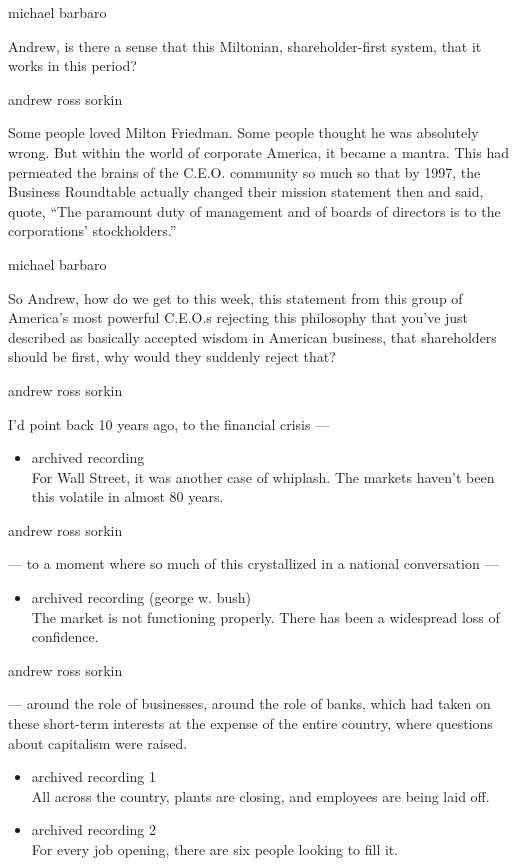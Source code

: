 michael barbaro

Andrew, is there a sense that this Miltonian, shareholder-first system,
that it works in this period?

andrew ross sorkin

Some people loved Milton Friedman. Some people thought he was absolutely
wrong. But within the world of corporate America, it became a mantra.
This had permeated the brains of the C.E.O. community so much so that by
1997, the Business Roundtable actually changed their mission statement
then and said, quote, ``The paramount duty of management and of boards
of directors is to the corporations' stockholders.''

michael barbaro

So Andrew, how do we get to this week, this statement from this group of
America's most powerful C.E.O.s rejecting this philosophy that you've
just described as basically accepted wisdom in American business, that
shareholders should be first, why would they suddenly reject that?

andrew ross sorkin

I'd point back 10 years ago, to the financial crisis ---

\begin{itemize}
\tightlist
\item
  archived recording\\
  For Wall Street, it was another case of whiplash. The markets haven't
  been this volatile in almost 80 years.
\end{itemize}

andrew ross sorkin

--- to a moment where so much of this crystallized in a national
conversation ---

\begin{itemize}
\tightlist
\item
  archived recording (george w. bush)\\
  The market is not functioning properly. There has been a widespread
  loss of confidence.
\end{itemize}

andrew ross sorkin

--- around the role of businesses, around the role of banks, which had
taken on these short-term interests at the expense of the entire
country, where questions about capitalism were raised.

\begin{itemize}
\item
  archived recording 1\\
  All across the country, plants are closing, and employees are being
  laid off.
\item
  archived recording 2\\
  For every job opening, there are six people looking to fill it.
\end{itemize}

